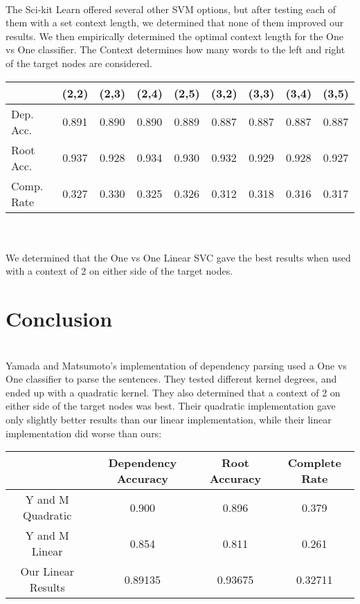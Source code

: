 \documentclass[12pt,fleqn]{article}
\begin{document}
\noindent \\        
The Sci-kit Learn offered several other SVM options, but after testing each of them with a set context length, we determined
that none of them improved our results. We then empirically determined the optimal context length for the One vs One classifier. The Context determines how many words to the left and right of the target nodes are considered. \\
\begin{tabular}{|l|cccc|cccc|}
            \cline{2-9} \multicolumn{1}{c|}{} & (2,2) & (2,3) & (2,4) & (2,5) & (3,2) & (3,3) & (3,4) & (3,5) \\ \hline
            Dep. Acc. & 0.891 & 0.890 & 0.890 & 0.889 & 0.887 & 0.887 & 0.887 & 0.887 \\
            Root Acc. & 0.937 & 0.928 & 0.934 & 0.930 & 0.932 & 0.929 & 0.928 & 0.927 \\
            Comp. Rate & 0.327 & 0.330 & 0.325 & 0.326 & 0.312 & 0.318 & 0.316 & 0.317 \\ \hline
\end{tabular}\\

\noindent \\
We determined that the One vs One Linear SVC gave the best results when used with a context of 2 on either side of the target nodes. 

\section{Conclusion}

\noindent \\
Yamada and Matsumoto's implementation of dependency parsing used a One vs One classifier to parse the sentences. They tested different kernel degrees, and ended up with a quadratic kernel. They also determined that a context of 2 on either side of the target nodes was best. Their quadratic implementation gave only slightly better results than our linear implementation, while their linear implementation did worse than ours:       \\
 \begin{tabular}{|c|c|c|c|}
            \hline & Dependency Accuracy & Root Accuracy & Complete Rate \\ \hline
            Y and M Quadratic & 0.900 & 0.896 & 0.379 \\ \hline
            Y and M Linear & 0.854 & 0.811 & 0.261 \\ \hline
            Our Linear Results & 0.89135 & 0.93675 & 0.32711 \\ \hline

        \end{tabular}\\
\end{document}
